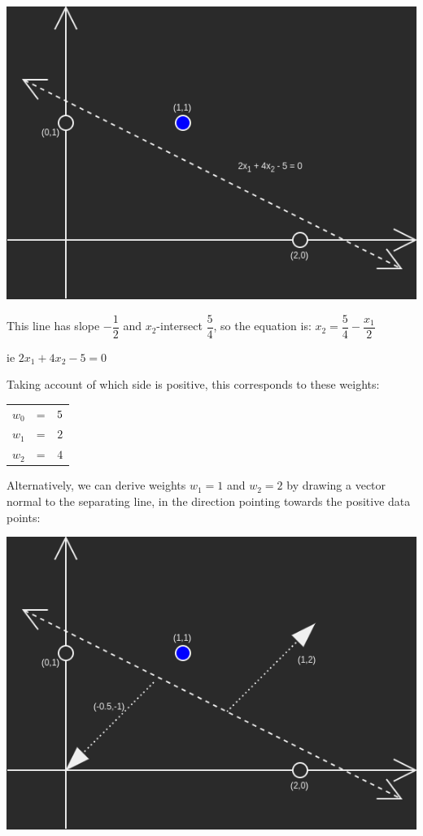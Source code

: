 \documentclass[11pt]{article}
\begin{document}
\includegraphics[width=\textwidth,height=\textheight,keepaspectratio]{graph_1}

This line has slope \(-\dfrac{1}{2}\) and \(x_2\)-intersect \(\dfrac{5}{4}\), so the equation is:
\(x_2 = \dfrac{5}{4} - \dfrac{x_1}{2}\)

ie \(2x_1 + 4x_2 - 5 = 0\)

Taking account of which side is positive, this corresponds to these weights:

\begin{center}
\begin{tabular}{ |c|c|c| }
    \(w_0\) & = & \(\-5\) \\
    \(w_1\) & = & \(2\) \\
    \(w_2\) & = & \(4\)
\end{tabular}
\end{center}

Alternatively, we can derive weights \(w_1 = 1\) and \(w_2=2\) by drawing a vector normal to the separating line, in the direction pointing towards the positive data points:

\includegraphics[width=\textwidth,height=\textheight,keepaspectratio]{graph_2}
\end{document}
